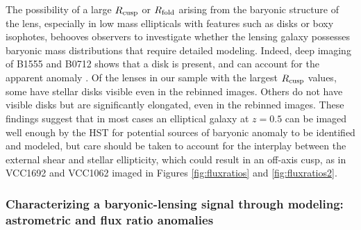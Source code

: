 The possibility of a large $R_{\rm{cusp}}$ or $R_{\rm{fold}}$ arising from the baryonic structure of the lens, especially in low mass ellipticals with features such as disks or boxy isophotes, behooves observers to investigate whether the lensing galaxy possesses baryonic mass distributions that require detailed modeling. Indeed, deep imaging of B1555 and B0712 shows that a disk is present, and can account for the apparent anomaly \citep{Hsueh++16}. Of the lenses in our sample with the largest $R_{\rm{cusp}}$ values, some have stellar disks visible even in the rebinned images. Others do not have visible disks but are significantly elongated, even in the rebinned images. These findings suggest that in most cases an elliptical galaxy at $z=0.5$ can be imaged well enough by the HST for potential sources of baryonic anomaly to be identified and modeled, but care should be taken to account for the interplay between the external shear and stellar ellipticity, which could result in an off-axis cusp, as in VCC1692 and VCC1062 imaged in Figures \ref{fig:fluxratios} and \ref{fig:fluxratios2}.

\subsubsection{Characterizing a baryonic-lensing signal through modeling: astrometric and flux ratio anomalies}  

